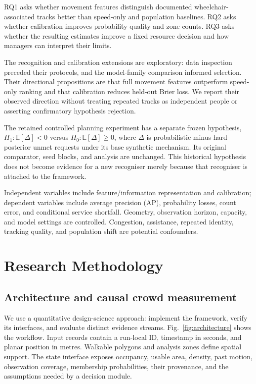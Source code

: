 \documentclass[conference]{IEEEtran}
\newcommand{\E}{\mathbb{E}}
\begin{document}
RQ1 asks whether movement features distinguish documented wheelchair-associated tracks better than speed-only and population baselines. RQ2 asks whether calibration improves probability quality and zone counts. RQ3 asks whether the resulting estimates improve a fixed resource decision and how managers can interpret their limits.

The recognition and calibration extensions are exploratory: data inspection preceded their protocols, and the model-family comparison informed selection. Their directional propositions are that full movement features outperform speed-only ranking and that calibration reduces held-out Brier loss. We report their observed direction without treating repeated tracks as independent people or asserting confirmatory hypothesis rejection.

The retained controlled planning experiment has a separate frozen hypothesis, $H_1:\E[\Delta]<0$ versus $H_0:\E[\Delta]\geq0$, where $\Delta$ is probabilistic minus hard-posterior unmet requests under its base synthetic mechanism. Its original comparator, seed blocks, and analysis are unchanged. This historical hypothesis does not become evidence for a new recogniser merely because that recogniser is attached to the framework.

Independent variables include feature/information representation and calibration; dependent variables include average precision (AP), probability losses, count error, and conditional service shortfall. Geometry, observation horizon, capacity, and model settings are controlled. Congestion, assistance, repeated identity, tracking quality, and population shift are potential confounders.

\section{Research Methodology}
\subsection{Architecture and causal crowd measurement}
We use a quantitative design-science approach: implement the framework, verify its interfaces, and evaluate distinct evidence streams. Fig.~\ref{fig:architecture} shows the workflow. Input records contain a run-local ID, timestamp in seconds, and planar position in metres. Walkable polygons and analysis zones define spatial support. The state interface exposes occupancy, usable area, density, past motion, observation coverage, membership probabilities, their provenance, and the assumptions needed by a decision module.
\end{document}
